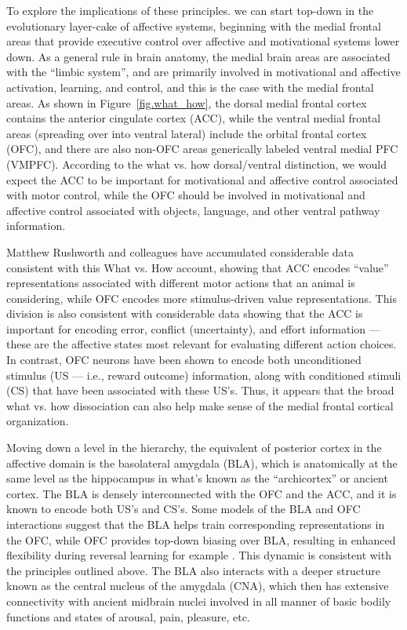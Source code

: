 \documentclass[11pt,twoside]{article}
\begin{document}
To explore the implications of these principles. we can start top-down
in the evolutionary layer-cake of affective systems, beginning with
the medial frontal areas that provide executive control over affective
and motivational systems lower down.  As a general rule in brain
anatomy, the medial brain areas are associated with the ``limbic
system'', and are primarily involved in motivational and affective
activation, learning, and control, and this is the case with the
medial frontal areas.  As shown in Figure~\ref{fig.what_how}, the
dorsal medial frontal cortex contains the anterior cingulate cortex
(ACC), while the ventral medial frontal areas (spreading over into
ventral lateral) include the orbital frontal cortex (OFC), and there
are also non-OFC areas generically labeled ventral medial PFC (VMPFC).
According to the what vs. how dorsal/ventral distinction, we would
expect the ACC to be important for motivational and affective control
associated with motor control, while the OFC should be involved in
motivational and affective control associated with objects, language,
and other ventral pathway information.

Matthew Rushworth and colleagues have accumulated considerable data
consistent with this What vs. How account, showing that ACC encodes
``value'' representations associated with different motor actions that
an animal is considering, while OFC encodes more stimulus-driven value
representations.  This division is also consistent with considerable
data showing that the ACC is important for encoding error, conflict
(uncertainty), and effort information --- these are the affective
states most relevant for evaluating different action choices.  In
contrast, OFC neurons have been shown to encode both unconditioned
stimulus (US --- i.e., reward outcome) information, along with
conditioned stimuli (CS) that have been associated with these US's.
Thus, it appears that the broad what vs. how dissociation can also
help make sense of the medial frontal cortical organization.

Moving down a level in the hierarchy, the equivalent of posterior
cortex in the affective domain is the basolateral amygdala (BLA),
which is anatomically at the same level as the hippocampus in what's
known as the ``archicortex'' or ancient cortex.  The BLA is densely
interconnected with the OFC and the ACC, and it is known to encode
both US's and CS's.  Some models of the BLA and OFC interactions
suggest that the BLA helps train corresponding representations in the
OFC, while OFC provides top-down biasing over BLA, resulting in
enhanced flexibility during reversal learning for example
\cite{FrankClaus06,PauliEtAl12}.  This dynamic is consistent with the
principles outlined above.  The BLA also interacts with a deeper
structure known as the central nucleus of the amygdala (CNA), which
then has extensive connectivity with ancient midbrain nuclei involved
in all manner of basic bodily functions and states of arousal, pain,
pleasure, etc.
\end{document}
